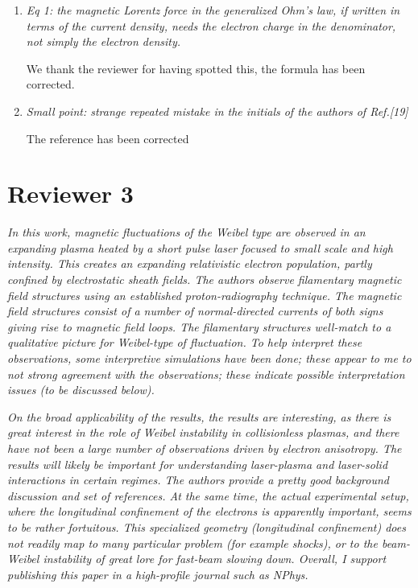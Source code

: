 \documentclass[aps,showpacs,superscriptaddress]{revtex4}%
\begin{document}
\begin{enumerate}
\item \textit{Eq 1: the magnetic Lorentz force in the generalized Ohm's law, if written in terms of the current density, needs the electron charge in the denominator, not simply the electron density. }

We thank the reviewer for having spotted this, the formula has been corrected.

\item \textit{Small point: strange repeated mistake in the initials of the authors of Ref.[19] }

The reference has been corrected

\end{enumerate}

\section{Reviewer 3 }
\textit{
In this work, magnetic fluctuations of the Weibel type are observed in an expanding plasma heated by a short pulse laser focused to small scale and high intensity. This creates an expanding relativistic electron population, partly confined by electrostatic sheath fields. The authors observe filamentary magnetic field structures using an established proton-radiography technique. The magnetic field structures consist of a number of normal-directed currents of both signs giving rise to magnetic field loops. The filamentary structures well-match to a qualitative picture for Weibel-type of fluctuation. To help interpret these observations, some interpretive simulations have been done; these appear to me to not strong agreement with the observations; these indicate possible interpretation issues (to be discussed below).}

\textit{
On the broad applicability of the results, the results are interesting, as there is great interest in the role of Weibel instability in collisionless plasmas, and there have not been a large number of observations driven by electron anisotropy. The results will likely be important for understanding laser-plasma and laser-solid interactions in certain regimes. The authors provide a pretty good background discussion and set of references. At the same time, the actual experimental setup, where the longitudinal confinement of the electrons is apparently important, seems to be rather fortuitous. This specialized geometry (longitudinal confinement) does not readily map to many particular problem (for example shocks), or to the beam-Weibel instability of great lore for fast-beam slowing down. Overall, I support publishing this paper in a high-profile journal such as NPhys.}
\end{document}
